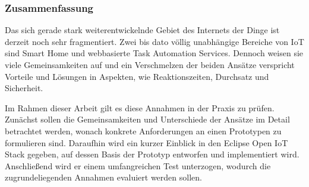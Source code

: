 \null\vfill
\begin{center}
	\subsubsection*{Zusammenfassung}
\end{center}
Das sich gerade stark weiterentwickelnde Gebiet des Internets der Dinge ist derzeit noch sehr fragmentiert. Zwei bis dato völlig unabhängige Bereiche von IoT sind Smart Home und webbasierte Task Automation Services. Dennoch weisen sie viele Gemeinsamkeiten auf und ein Verschmelzen der beiden Ansätze verspricht Vorteile und Lösungen in Aspekten, wie Reaktionszeiten, Durchsatz und Sicherheit.

Im Rahmen dieser Arbeit gilt es diese Annahmen in der Praxis zu prüfen.
Zunächst sollen die Gemeinsamkeiten und Unterschiede der Ansätze im Detail betrachtet werden, wonach konkrete Anforderungen an einen Prototypen zu formulieren sind. 
Daraufhin wird ein kurzer Einblick in den Eclipse Open IoT Stack gegeben, auf dessen Basis der Prototyp entworfen und implementiert wird. 
Anschließend wird er einem umfangreichen Test unterzogen, wodurch die zugrundeliegenden Annahmen evaluiert werden sollen.



\vfill\null